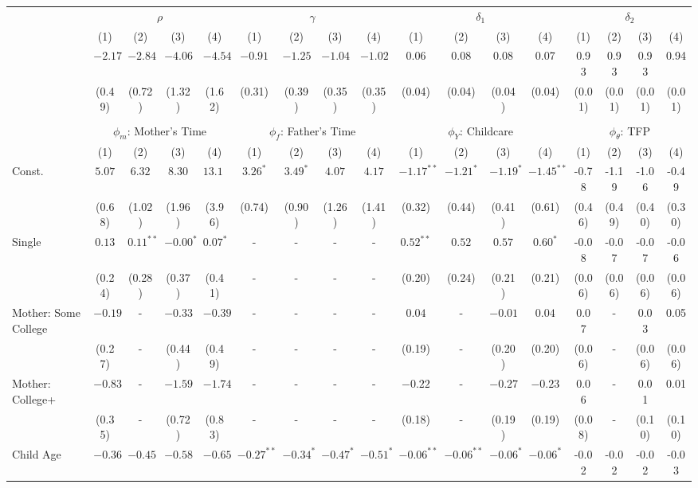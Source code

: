 \begin{tabular}{lcccccccccccccccc}\\\toprule
 & \multicolumn{4}{c}{$\rho$} & \multicolumn{4}{c}{$\gamma$} & \multicolumn{4}{c}{$\delta_{1}$} & \multicolumn{4}{c}{$\delta_{2}$} \\
&(1)&(2)&(3)&(4)&(1)&(2)&(3)&(4)&(1)&(2)&(3)&(4)&(1)&(2)&(3)&(4)\\\cmidrule(r){2-5}\cmidrule(r){6-9}\cmidrule(r){10-13}\cmidrule(r){14-17}
&$-2.17$&$-2.84$&$-4.06$&$-4.54$&$-0.91$&$-1.25$&$-1.04$&$-1.02$&0.06&0.08&0.08&0.07&0.93&0.93&0.93&0.94\\
&(0.49)&(0.72)&(1.32)&(1.62)&(0.31)&(0.39)&(0.35)&(0.35)&(0.04)&(0.04)&(0.04)&(0.04)&(0.01)&(0.01)&(0.01)&(0.01)\\
&&&&&&&&&&&&&&&&\\
 & \multicolumn{4}{c}{$\phi_{m}$: Mother's Time} & \multicolumn{4}{c}{$\phi_{f}$: Father's Time} & \multicolumn{4}{c}{$\phi_{Y}$: Childcare} & \multicolumn{4}{c}{$\phi_{\theta}$: TFP} \\
&(1)&(2)&(3)&(4)&(1)&(2)&(3)&(4)&(1)&(2)&(3)&(4)&(1)&(2)&(3)&(4)\\\cmidrule(r){2-5}\cmidrule(r){6-9}\cmidrule(r){10-13}\cmidrule(r){14-17}
Const.&$5.07$&$6.32$&$8.30$&$13.18$&$3.26^{*}$&$3.49^{*}$&$4.07$&$4.17$&$-1.17^{**}$&$-1.21^{*}$&$-1.19^{*}$&$-1.45^{**}$&-0.78&-1.19&-1.06&-0.49\\
&(0.68)&(1.02)&(1.96)&(3.96)&(0.74)&(0.90)&(1.26)&(1.41)&(0.32)&(0.44)&(0.41)&(0.61)&(0.46)&(0.49)&(0.40)&(0.30)\\
Single&$0.13$&$0.11^{**}$&$-0.00^{*}$&$0.07^{*}$&-&-&-&-&$0.52^{**}$&$0.52$&$0.57$&$0.60^{*}$&-0.08&-0.07&-0.07&-0.06\\
&(0.24)&(0.28)&(0.37)&(0.41)&-&-&-&-&(0.20)&(0.24)&(0.21)&(0.21)&(0.06)&(0.06)&(0.06)&(0.06)\\
Mother: Some College&$-0.19$&-&$-0.33$&$-0.39$&-&-&-&-&$0.04$&-&$-0.01$&$0.04$&0.07&-&0.03&0.05\\
&(0.27)&-&(0.44)&(0.49)&-&-&-&-&(0.19)&-&(0.20)&(0.20)&(0.06)&-&(0.06)&(0.06)\\
Mother: College+&$-0.83$&-&$-1.59$&$-1.74$&-&-&-&-&$-0.22$&-&$-0.27$&$-0.23$&0.06&-&0.01&0.01\\
&(0.35)&-&(0.72)&(0.83)&-&-&-&-&(0.18)&-&(0.19)&(0.19)&(0.08)&-&(0.10)&(0.10)\\
Child Age&$-0.36$&$-0.45$&$-0.58$&$-0.65$&$-0.27^{**}$&$-0.34^{*}$&$-0.47^{*}$&$-0.51^{*}$&$-0.06^{**}$&$-0.06^{**}$&$-0.06^{*}$&$-0.06^{*}$&-0.02&-0.02&-0.02&-0.03\\

\end{tabular}
